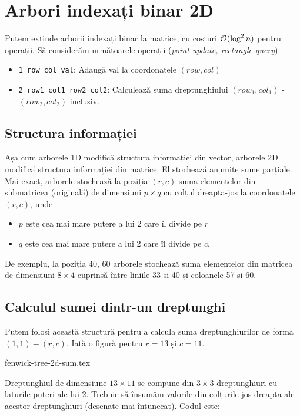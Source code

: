\documentclass[../main.tex]{subfiles}
\begin{document}
\section{Arbori indexați binar 2D}

Putem extinde arborii indexați binar la matrice, cu costuri $\mathcal{O}(\log^2 n)$ pentru operații. Să considerăm următoarele operații (\textit{point update, rectangle query}):

\begin{itemize}
  \item \texttt{1 row col val}: Adaugă val la coordonatele $(row, col)$
  \item \texttt{2 row1 col1 row2 col2}: Calculează suma dreptunghiului $(row_1, col_1)$ - $(row_2, col_2)$ inclusiv.
\end{itemize}

\subsection{Structura informației}

Așa cum arborele 1D modifică structura informației din vector, arborele 2D modifică structura informației din matrice. El stochează anumite sume parțiale. Mai exact, arborele stochează la poziția $(r, c)$ suma elementelor din submatricea (originală) de dimensiuni $p \times q$ cu colțul dreapta-jos la coordonatele $(r, c)$, unde

\begin{itemize}
  \item $p$ este cea mai mare putere a lui 2 care îl divide pe $r$
  \item $q$ este cea mai mare putere a lui 2 care îl divide pe $c$.
\end{itemize}

De exemplu, la poziția 40, 60 arborele stochează suma elementelor din matricea de dimensiuni $8 \times 4$ cuprinsă între liniile 33 și 40 și coloanele 57 și 60.

\subsection{Calculul sumei dintr-un dreptunghi}

Putem folosi această structură pentru a calcula suma dreptunghiurilor de forma $(1,1) - (r, c)$. Iată o figură pentru $r = 13$ și $c = 11$.

{fenwick-tree-2d-sum.tex}

Dreptunghiul de dimensiune $13 \times 11$ se compune din $3 \times 3$ dreptunghiuri cu laturile puteri ale lui 2. Trebuie să însumăm valorile din colțurile jos-dreapta ale acestor dreptunghiuri (desenate mai întunecat). Codul este:
\end{document}
